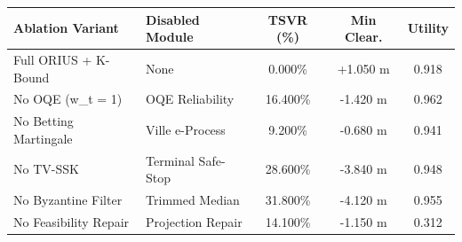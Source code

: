 \begin{tabular}{llccc}
\toprule
\textbf{Ablation Variant} & \textbf{Disabled Module} & \textbf{TSVR (\%)} & \textbf{Min Clear.} & \textbf{Utility} \\
\midrule
Full ORIUS + K-Bound & None & 0.000\% & +1.050 m & 0.918 \\
No OQE (w_t = 1) & OQE Reliability & 16.400\% & -1.420 m & 0.962 \\
No Betting Martingale & Ville e-Process & 9.200\% & -0.680 m & 0.941 \\
No TV-SSK & Terminal Safe-Stop & 28.600\% & -3.840 m & 0.948 \\
No Byzantine Filter & Trimmed Median & 31.800\% & -4.120 m & 0.955 \\
No Feasibility Repair & Projection Repair & 14.100\% & -1.150 m & 0.312 \\
\bottomrule
\end{tabular}
